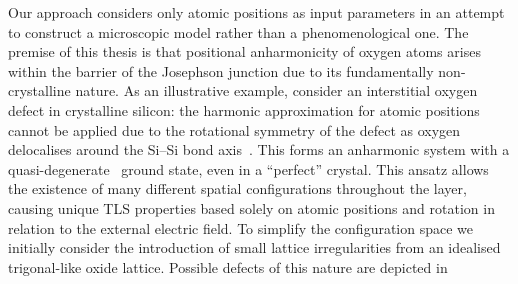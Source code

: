 Our approach considers only atomic positions as input parameters in an attempt to construct a microscopic model rather than a phenomenological one.
The premise of this thesis is that positional anharmonicity of oxygen atoms arises within the  barrier of the Josephson junction due to its fundamentally non-crystalline nature.
As an illustrative example, consider an interstitial oxygen defect in crystalline silicon: the harmonic approximation for atomic positions cannot be applied due to the rotational symmetry of the defect as oxygen delocalises around the Si--Si bond axis~\cite{Artacho1995}.
This forms an anharmonic system with a quasi-degenerate~\cite{DuBois2013} ground state, even in a ``perfect'' crystal.
This ansatz allows the existence of many different spatial configurations throughout the layer, causing unique TLS properties based solely on atomic positions and rotation in relation to the external electric field.
To simplify the configuration space we initially consider the introduction of small lattice irregularities from an idealised trigonal-like  oxide lattice.
Possible defects of this nature are depicted in %
